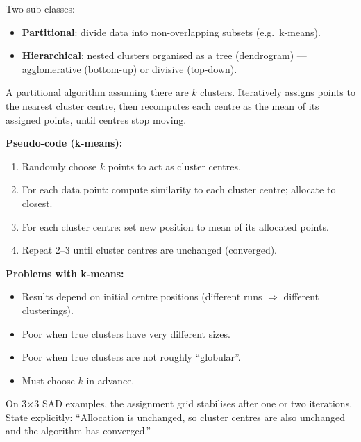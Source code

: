 Two sub-classes:
\begin{itemize}
  \item \textbf{Partitional}: divide data into non-overlapping subsets (e.g.\ k-means).
  \item \textbf{Hierarchical}: nested clusters organised as a tree (dendrogram) --- agglomerative (bottom-up) or divisive (top-down).
\end{itemize}

\separator

\begin{defbox}
A partitional algorithm assuming there are $k$ clusters. Iteratively assigns points to the nearest cluster centre, then recomputes each centre as the mean of its assigned points, until centres stop moving.
\end{defbox}

\textbf{Pseudo-code (k-means):}
\begin{enumerate}
  \item Randomly choose $k$ points to act as cluster centres.
  \item For each data point: compute similarity to each cluster centre; allocate to closest.
  \item For each cluster centre: set new position to mean of its allocated points.
  \item Repeat 2--3 until cluster centres are unchanged (converged).
\end{enumerate}

\textbf{Problems with k-means:}
\begin{itemize}
  \item Results depend on initial centre positions (different runs $\Rightarrow$ different clusterings).
  \item Poor when true clusters have very different sizes.
  \item Poor when true clusters are not roughly ``globular''.
  \item Must choose $k$ in advance.
\end{itemize}

\begin{tipbox}
On 3$\times$3 SAD examples, the assignment grid stabilises after one or two iterations. State explicitly: ``Allocation is unchanged, so cluster centres are also unchanged and the algorithm has converged.''
\end{tipbox}

\separator

